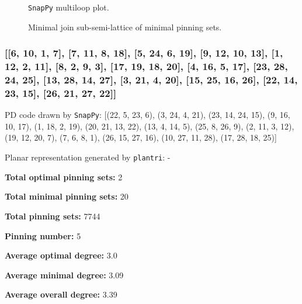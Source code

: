 \documentclass{article}%
\begin{document}
\begin{multicols}{2}
\begin{figure}[H]
\centering

\caption{\texttt{SnapPy} multiloop plot.}
\label{fig:tex/img/[[22, 28, 1, 23], [23, 8, 24, 7], [14, 21, 15, 22], [15, 27, 16, 28], [1, 9, 2, 8], [24, 18, 25, 19], [13, 6, 14, 7], [20, 5, 21, 6], [26, 10, 27, 11], [16, 10, 17, 9], [2, 17, 3, 18], [25, 3, 26, 4],.svg}
\end{figure}
\columnbreak

\begin{figure}[H]
\centering
\scalebox{0.8}{}
\caption{Minimal join sub-semi-lattice of minimal pinning sets.}
\label{fig:tex/img/[[22, 28, 1, 23], [23, 8, 24, 7], [14, 21, 15, 22], [15, 27, 16, 28], [1, 9, 2, 8], [24, 18, 25, 19], [13, 6, 14, 7], [20, 5, 21, 6], [26, 10, 27, 11], [16, 10, 17, 9], [2, 17, 3, 18], [25, 3, 26, 4],.pgf}
\end{figure}
\end{multicols}

\newpage

\subsubsection{[[6, 10, 1, 7], [7, 11, 8, 18], [5, 24, 6, 19], [9, 12, 10, 13], [1, 12, 2, 11], [8, 2, 9, 3], [17, 19, 18, 20], [4, 16, 5, 17], [23, 28, 24, 25], [13, 28, 14, 27], [3, 21, 4, 20], [15, 25, 16, 26], [22, 14, 23, 15], [26, 21, 27, 22]]}

{\small\noindent PD code drawn by \texttt{SnapPy}: [(22, 5, 23, 6), (3, 24, 4, 21), (23, 14, 24, 15), (9, 16, 10, 17), (1, 18, 2, 19), (20, 21, 13, 22), (13, 4, 14, 5), (25, 8, 26, 9), (2, 11, 3, 12), (19, 12, 20, 7), (7, 6, 8, 1), (26, 15, 27, 16), (10, 27, 11, 28), (17, 28, 18, 25)]}

{\small\noindent Planar representation generated by \texttt{plantri}: -}

\begin{multicols}{2}
{\normalsize \noindent\textbf{Total optimal pinning sets:} 2

\noindent\textbf{Total minimal pinning sets:} 20

\noindent\textbf{Total pinning sets:} 7744

\noindent\textbf{Pinning number:} 5

}
\columnbreak

{\normalsize \noindent\textbf{Average optimal degree:} 3.0

\noindent\textbf{Average minimal degree:} 3.09

\noindent\textbf{Average overall degree:} 3.39

}
\end{multicols}
\end{document}
